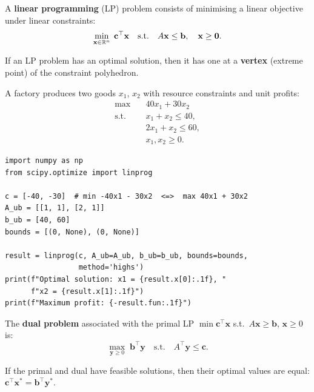 \begin{definition}
A \textbf{linear programming} (LP) problem consists of minimising a
linear objective under linear constraints:
\[
  \min_{\mathbf{x}\in\mathbb{R}^n}\;\mathbf{c}^\top\mathbf{x}
  \quad\text{s.t.}\quad
  A\mathbf{x}\leq\mathbf{b},\quad \mathbf{x}\geq\mathbf{0}.
\]
\end{definition}

\begin{theorem}
If an LP problem has an optimal solution, then it has one at a
\textbf{vertex} (extreme point) of the constraint polyhedron.
\end{theorem}

\begin{example}
A factory produces two goods $x_1$, $x_2$ with resource constraints
and unit profits:
\begin{align*}
  \max\quad & 40x_1 + 30x_2 \\
  \text{s.t.}\quad & x_1 + x_2 \leq 40, \\
  & 2x_1 + x_2 \leq 60, \\
  & x_1, x_2 \geq 0.
\end{align*}
\end{example}

\begin{codeblock}[title=\textbf{Linear programming with \texttt{scipy}}]
\begin{verbatim}
import numpy as np
from scipy.optimize import linprog

c = [-40, -30]  # min -40x1 - 30x2  <=>  max 40x1 + 30x2
A_ub = [[1, 1], [2, 1]]
b_ub = [40, 60]
bounds = [(0, None), (0, None)]

result = linprog(c, A_ub=A_ub, b_ub=b_ub, bounds=bounds,
                 method='highs')
print(f"Optimal solution: x1 = {result.x[0]:.1f}, "
      f"x2 = {result.x[1]:.1f}")
print(f"Maximum profit: {-result.fun:.1f}")
\end{verbatim}
\end{codeblock}

\begin{definition}[Duality]
The \textbf{dual problem} associated with the primal LP
$\min \mathbf{c}^\top\mathbf{x}$ s.t.\ $A\mathbf{x}\geq\mathbf{b}$,
$\mathbf{x}\geq 0$ is:
\[
  \max_{\mathbf{y}\geq 0}\;\mathbf{b}^\top\mathbf{y}
  \quad\text{s.t.}\quad
  A^\top\mathbf{y}\leq\mathbf{c}.
\]
\end{definition}

\begin{theorem}
If the primal and dual have feasible solutions, then their optimal
values are equal:
$\mathbf{c}^\top\mathbf{x}^* = \mathbf{b}^\top\mathbf{y}^*$.
\end{theorem}


